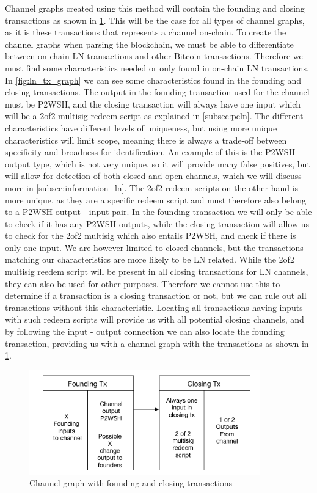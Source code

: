 Channel graphs created using this method will contain the founding and closing transactions as shown in \cref{fig:ln_tx_graph_small}.
This will be the case for all types of channel graphs, as it is these transactions that represents a channel on-chain.
To create the channel graphs when parsing the blockchain, we must be able to differentiate between on-chain LN transactions and other Bitcoin transactions. Therefore we must find some characteristics needed or only found in on-chain LN transactions. 
In \cref{fig:ln_tx_graph} we can see some characteristics found in the founding and closing transactions.
The output in the founding transaction used for the channel must be P2WSH, and the closing transaction will always have one input which will be a 2of2 multisig redeem script as explained in \cref{subsec:pcln}. The different characteristics have different levels of uniqueness, but using more unique characteristics will limit scope, meaning there is always a trade-off between specificity and broadness for identification. An example of this is the P2WSH output type, which is not very unique, so it will provide many false positives, but will allow for detection of both closed and open channels, which we will discuss more in \cref{subsec:information_ln}. 
The 2of2 redeem scripts on the other hand is more unique, as they are a specific redeem script and must therefore also belong to a P2WSH output - input pair. In the founding transaction we will only be able to check if it has any P2WSH outputs, while the closing transaction will allow us to check for the 2of2 multisig which also entails P2WSH, and check if there is only one input. We are however limited to closed channels, but the transactions matching our characteristics are more likely to be LN related. While the 2of2 multisig reedem script will be present in all closing transactions for LN channels, they can also be used for other purposes. Therefore we cannot use this to determine if a transaction is a closing transaction or not, but we can rule out all transactions without this characteristic. Locating all transactions having inputs with such redeem scripts will provide us with all potential closing channels, and by following the input - output connection we can also locate the founding transaction, providing us with a channel graph with the transactions as shown in \cref{fig:ln_tx_graph_small}.

\begin{figure}[h]
    \centering
    \includegraphics[width=10cm]{figures/ln_tx_graph_small.png}
    \caption{Channel graph with founding and closing transactions}
    \label{fig:ln_tx_graph_small}
\end{figure}

